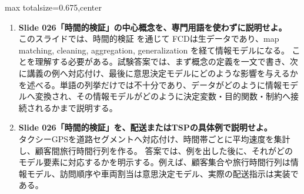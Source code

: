 \begin{adjustbox}{max totalsize={\textwidth}{0.675\textheight},center}
\begin{minipage}{\textwidth}
\begin{minipage}[t]{0.485\textwidth}
\begin{enumerate}
\item \textbf{Slide 026「時間的検証」の中心概念を、専門用語を使わずに説明せよ。}\\このスライドでは、時間的検証 を通じて FCDは生データであり、map matching, cleaning, aggregation, generalization を経て情報モデルになる。 ことを理解する必要がある。試験答案では、まず概念の定義を一文で書き、次に講義の例へ対応付け、最後に意思決定モデルにどのような影響を与えるかを述べる。単語の列挙だけでは不十分であり、データがどのように情報モデルへ変換され、その情報モデルがどのように決定変数・目的関数・制約へ接続されるかまで説明する。
\item \textbf{Slide 026「時間的検証」を、配送またはTSPの具体例で説明せよ。}\\タクシーGPSを道路セグメントへ対応付け、時間帯ごとに平均速度を集計し、顧客間旅行時間行列を作る。 答案では、例を出した後に、それがどのモデル要素に対応するかを明示する。例えば、顧客集合や旅行時間行列は情報モデル、訪問順序や車両割当は意思決定モデル、実際の配送指示は実装である。
\end{enumerate}
\end{minipage}
\end{minipage}
\end{adjustbox}

